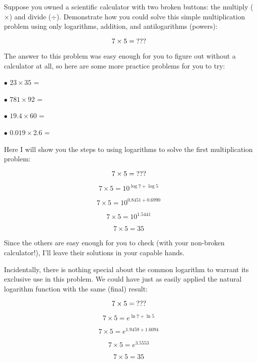 

Suppose you owned a scientific calculator with two broken buttons: the multiply ($\times$) and divide ($\div$).  Demonstrate how you could solve this simple multiplication problem using only logarithms, addition, and antilogarithms (powers):

$$7 \times 5 = \hbox{???}$$

The answer to this problem was easy enough for you to figure out without a calculator at all, so here are some more practice problems for you to try:

\medskip
\goodbreak
\item{$\bullet$} $23 \times 35$ = 
\vskip 5pt
\item{$\bullet$} $781 \times 92$ = 
\vskip 5pt
\item{$\bullet$} $19.4 \times 60$ = 
\vskip 5pt
\item{$\bullet$} $0.019 \times 2.6$ = 
\medskip







Here I will show you the steps to using logarithms to solve the first multiplication problem:

$$7 \times 5 = \hbox{???}$$

$$7 \times 5 = 10^{\log 7 + \log 5}$$

$$7 \times 5 = 10^{0.8451 + 0.6990}$$

$$7 \times 5 = 10^{1.5441}$$

$$7 \times 5 = 35$$

Since the others are easy enough for you to check (with your non-broken calculator!), I'll leave their solutions in your capable hands.







Incidentally, there is nothing special about the common logarithm to warrant its exclusive use in this problem.  We could have just as easily applied the natural logarithm function with the same (final) result:

$$7 \times 5 = \hbox{???}$$

$$7 \times 5 = e^{\ln 7 + \ln 5}$$

$$7 \times 5 = e^{1.9459 + 1.6094}$$

$$7 \times 5 = e^{3.5553}$$

$$7 \times 5 = 35$$




